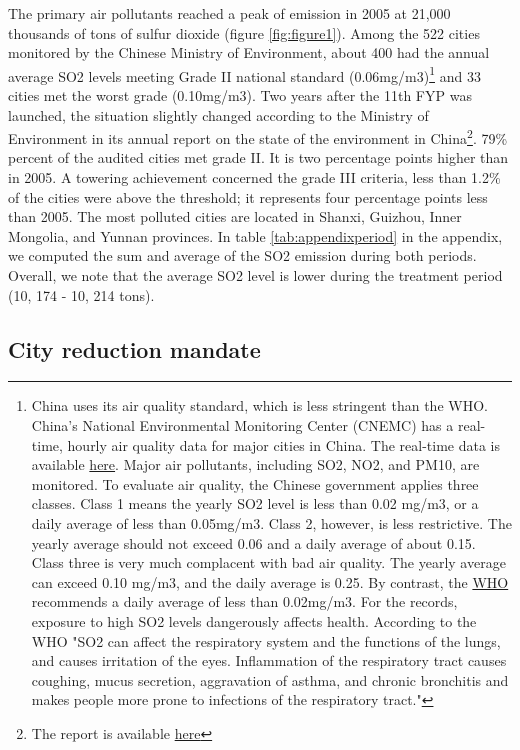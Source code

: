 \documentclass[12pt]{article}
\begin{document}
The primary air pollutants reached a peak of emission in 2005 at 21,000 thousands of tons of sulfur dioxide (figure \ref{fig:figure1}). Among the 522 cities monitored by the Chinese Ministry of Environment, about 400 had the annual average SO2 levels meeting Grade II national standard (0.06mg/m3)\footnote{China uses its air quality standard, which is less stringent than the WHO. China's National Environmental Monitoring Center (CNEMC) has a real-time, hourly air quality data for major cities in China. The real-time data is available \href{http://www.cnemc.cn/}{here}. Major air pollutants, including SO2, NO2, and PM10, are monitored. To evaluate air quality, the Chinese government applies three classes. Class 1 means the yearly SO2 level is less than 0.02 mg/m3, or a daily average of less than 0.05mg/m3. Class 2, however, is less restrictive. The yearly average should not exceed 0.06 and a daily average of about 0.15. Class three is very much complacent with bad air quality. The yearly average can exceed 0.10 mg/m3, and the daily average is 0.25. By contrast, the \href{https://www.who.int/news-room/fact-sheets/detail/ambient-(outdoor)-air-quality-and-health}{WHO} recommends a daily average of less than 0.02mg/m3. For the records, exposure to high SO2 levels dangerously affects health. According to the WHO "SO2 can affect the respiratory system and the functions of the lungs, and causes irritation of the eyes. Inflammation of the respiratory tract causes coughing, mucus secretion, aggravation of asthma, and chronic bronchitis and makes people more prone to infections of the respiratory tract."} and 33 cities met the worst grade (0.10mg/m3). Two years after the 11th FYP was launched, the situation slightly changed according to the Ministry of Environment in its annual report on the state of the environment in China\footnote{The report is available \href{http://english.mee.gov.cn/Resources/Reports/soe/soe2007/201}{here}}. 79\% percent of the audited cities met grade II. It is two percentage points higher than in 2005. A towering achievement concerned the grade III criteria, less than 1.2\% of the cities were above the threshold; it represents four percentage points less than 2005. The most polluted cities are located in Shanxi, Guizhou, Inner Mongolia, and Yunnan provinces. In table \ref{tab:appendixperiod} in the appendix, we computed the sum and average of the SO2 emission during both periods. Overall, we note that the average SO2 level is lower during the treatment period (10, 174 - 10, 214 tons).

\subsection{City reduction mandate} \label{sec:mandate}
\end{document}
